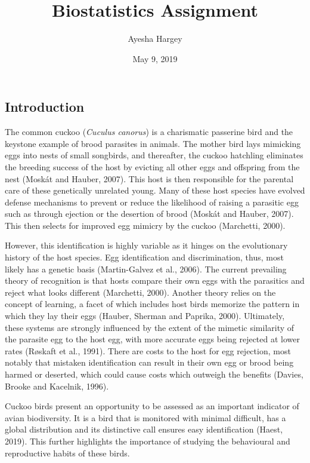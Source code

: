 \documentclass[]{article}
\title{Biostatistics Assignment}
\author{Ayesha Hargey}
\date{May 9, 2019}
\begin{document}
\maketitle

\subsection{Introduction}\label{introduction}

The common cuckoo (\emph{Cuculus canorus}) is a charismatic passerine
bird and the keystone example of brood parasites in animals. The mother
bird lays mimicking eggs into nests of small songbirds, and thereafter,
the cuckoo hatchling eliminates the breeding success of the host by
evicting all other eggs and offspring from the nest (Moskát and Hauber,
2007). This host is then responsible for the parental care of these
genetically unrelated young. Many of these host species have evolved
defense mechanisms to prevent or reduce the likelihood of raising a
parasitic egg such as through ejection or the desertion of brood (Moskát
and Hauber, 2007). This then selects for improved egg mimicry by the
cuckoo (Marchetti, 2000).

However, this identification is highly variable as it hinges on the
evolutionary history of the host species. Egg identification and
discrimination, thus, most likely has a genetic basis (Martin-Galvez et
al., 2006). The current prevailing theory of recognition is that hosts
compare their own eggs with the parasitics and reject what looks
different (Marchetti, 2000). Another theory relies on the concept of
learning, a facet of which includes host birds memorize the pattern in
which they lay their eggs (Hauber, Sherman and Paprika, 2000).
Ultimately, these systems are strongly influenced by the extent of the
mimetic similarity of the parasite egg to the host egg, with more
accurate eggs being rejected at lower rates (Røskaft et al., 1991).
There are costs to the host for egg rejection, most notably that
mistaken identification can result in their own egg or brood being
harmed or deserted, which could cause costs which outweigh the benefits
(Davies, Brooke and Kacelnik, 1996).

Cuckoo birds present an opportunity to be assessed as an important
indicator of avian biodiversity. It is a bird that is monitored with
minimal difficult, has a global distribution and its distinctive call
ensures easy identification (Haest, 2019). This further highlights the
importance of studying the behavioural and reproductive habits of these
birds.
\end{document}
